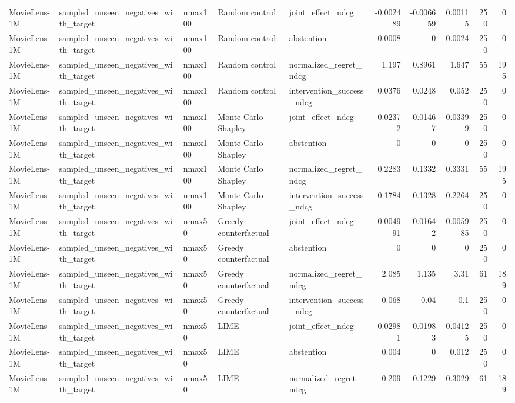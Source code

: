 \begin{table}[t]
{\begin{tabular}{lllllrrrrr}
MovieLens-1M & sampled\_unseen\_negatives\_with\_target & nmax100 & Random control & joint\_effect\_ndcg & -0.002489 & -0.006659 & 0.00115 & 250 & 0 \\
MovieLens-1M & sampled\_unseen\_negatives\_with\_target & nmax100 & Random control & abstention & 0.0008 & 0 & 0.0024 & 250 & 0 \\
MovieLens-1M & sampled\_unseen\_negatives\_with\_target & nmax100 & Random control & normalized\_regret\_ndcg & 1.197 & 0.8961 & 1.647 & 55 & 195 \\
MovieLens-1M & sampled\_unseen\_negatives\_with\_target & nmax100 & Random control & intervention\_success\_ndcg & 0.0376 & 0.0248 & 0.052 & 250 & 0 \\
MovieLens-1M & sampled\_unseen\_negatives\_with\_target & nmax100 & Monte Carlo Shapley & joint\_effect\_ndcg & 0.02372 & 0.01467 & 0.03399 & 250 & 0 \\
MovieLens-1M & sampled\_unseen\_negatives\_with\_target & nmax100 & Monte Carlo Shapley & abstention & 0 & 0 & 0 & 250 & 0 \\
MovieLens-1M & sampled\_unseen\_negatives\_with\_target & nmax100 & Monte Carlo Shapley & normalized\_regret\_ndcg & 0.2283 & 0.1332 & 0.3331 & 55 & 195 \\
MovieLens-1M & sampled\_unseen\_negatives\_with\_target & nmax100 & Monte Carlo Shapley & intervention\_success\_ndcg & 0.1784 & 0.1328 & 0.2264 & 250 & 0 \\
MovieLens-1M & sampled\_unseen\_negatives\_with\_target & nmax50 & Greedy counterfactual & joint\_effect\_ndcg & -0.004991 & -0.01642 & 0.005985 & 250 & 0 \\
MovieLens-1M & sampled\_unseen\_negatives\_with\_target & nmax50 & Greedy counterfactual & abstention & 0 & 0 & 0 & 250 & 0 \\
MovieLens-1M & sampled\_unseen\_negatives\_with\_target & nmax50 & Greedy counterfactual & normalized\_regret\_ndcg & 2.085 & 1.135 & 3.31 & 61 & 189 \\
MovieLens-1M & sampled\_unseen\_negatives\_with\_target & nmax50 & Greedy counterfactual & intervention\_success\_ndcg & 0.068 & 0.04 & 0.1 & 250 & 0 \\
MovieLens-1M & sampled\_unseen\_negatives\_with\_target & nmax50 & LIME & joint\_effect\_ndcg & 0.02981 & 0.01983 & 0.04125 & 250 & 0 \\
MovieLens-1M & sampled\_unseen\_negatives\_with\_target & nmax50 & LIME & abstention & 0.004 & 0 & 0.012 & 250 & 0 \\
MovieLens-1M & sampled\_unseen\_negatives\_with\_target & nmax50 & LIME & normalized\_regret\_ndcg & 0.209 & 0.1229 & 0.3029 & 61 & 189 \\

\end{tabular}}
\end{table}
